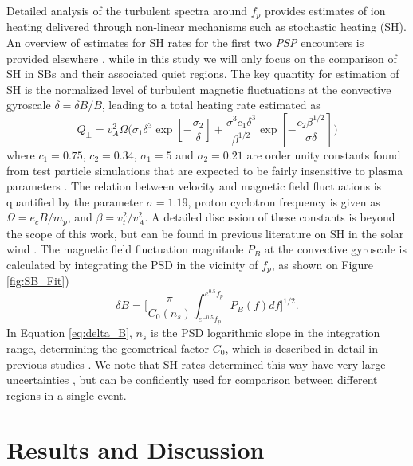 \documentclass[]{aastex62}
\begin{document}
Detailed analysis of the turbulent spectra around $f_p$ provides estimates of ion heating delivered through non-linear mechanisms such as stochastic heating (SH). An overview of estimates for SH rates for the first two \emph{PSP} encounters is provided elsewhere \citep{Martinovic_2020_ApJS}, while in this study we will only focus on the comparison of SH in SBs and their associated quiet regions. The key quantity for estimation of SH is the normalized level of turbulent magnetic fluctuations at the convective gyroscale $\delta = \delta B / B$, leading to a total heating rate estimated as \citep{Hoppock_2019}
%
\begin{equation}
Q_\perp = v_A^2 \Omega \Bigg( \sigma_1 \delta^3 \exp \left[-\frac{\sigma_2}{\delta}\right] + \frac{\sigma^3 c_1 \delta^3}{\beta^{1/2}} \exp \left[-\frac{c_2 \beta^{1/2}}{ \sigma \delta}\right] \Bigg)
\label{eq:Heating_Rate}
\end{equation}
%
where $c_1 = 0.75$, $c_2 = 0.34$, $\sigma_1 = 5$ and $\sigma_2 = 0.21$ are order unity constants found from test particle simulations that are expected to be fairly insensitive to plasma parameters \citep{Chandran_2010,Hoppock_2019}. The relation between velocity and magnetic field fluctuations is quantified by the parameter $\sigma = 1.19$, proton cyclotron frequency is given as $\Omega = e_c B / m_p$, and $\beta = v_t^2 / v_A^2$. A detailed discussion of these constants is beyond the scope of this work, but can be found in previous literature on SH in the solar wind \citep{Chandran_2010,Xia_2013,Hoppock_2019,Martinovic_2019_ApJ}. The magnetic field fluctuation magnitude $P_B$ at the convective gyroscale is calculated by integrating the PSD in the vicinity of $f_p$, as shown on Figure \ref{fig:SB_Fit})
%
\begin{equation}
    \delta B = \Bigg[\frac{\pi}{C_0(n_{s})}  \int_{e^{-0.5} f_p}^{e^{0.5} f_p} P_B(f) df \Bigg]^{1/2} \label{eq:delta_B}.
\end{equation}
%
In Equation \ref{eq:delta_B}, $n_s$ is the PSD logarithmic slope in the integration range, determining the geometrical factor $C_0$, which is described in detail in previous studies \citep{Bourouaine_2013,Vech_2017}. We note that SH rates determined this way have very large uncertainties \citep{Martinovic_2019_ApJ}, but can be confidently used for comparison between different regions in a single event. 


\section{Results and Discussion} 
\label{sec:Results}
\end{document}
